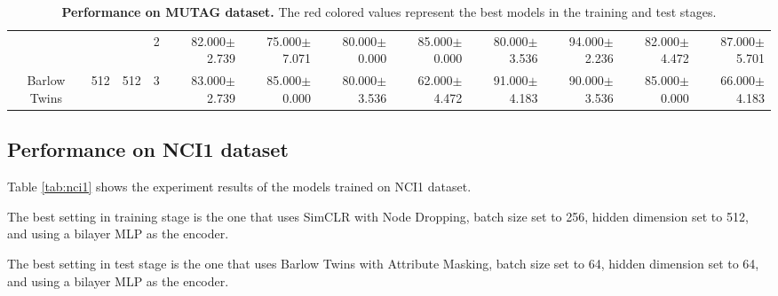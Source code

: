 \begin{table}[htpb]
{\begin{tabular}{c|c|c|c|rr|rr|rr|rr}
                                 &                                                                                 &                                                                                        & 2                                                                                         & 82.000$\pm$2.739                        & 75.000$\pm$7.071                        & 80.000$\pm$0.000                        & 85.000$\pm$0.000                        & 80.000$\pm$3.536                         & 94.000$\pm$2.236                         & 82.000$\pm$4.472                        & 87.000$\pm$5.701                       \\
\multirow{-12}{*}{Barlow Twins}  & \multirow{-6}{*}{512}                                                           & \multirow{-3}{*}{512}                                                                  & 3                                                                                         & 83.000$\pm$2.739                        & 85.000$\pm$0.000                        & 80.000$\pm$3.536                        & 62.000$\pm$4.472                        & 91.000$\pm$4.183                         & 90.000$\pm$3.536                         & 85.000$\pm$0.000                        & 66.000$\pm$4.183                       \\ \hline
\end{tabular}
}
\caption[Performance on MUTAG dataset]{\textbf{Performance on MUTAG dataset.} The red colored values represent the best models in the training and test stages.}
		\label{tab:mutag}
\end{table}



\subsection{Performance on NCI1 dataset}

Table \ref{tab:nci1} shows the experiment results of the models trained on NCI1 dataset.


The best setting in training stage is the one that uses SimCLR with Node Dropping, batch size set to 256, hidden dimension set to 512, and using a bilayer MLP as the encoder.

The best setting in test stage is the one that uses Barlow Twins with Attribute Masking, batch size set to 64, hidden dimension set to 64, and using a bilayer MLP as the encoder.


